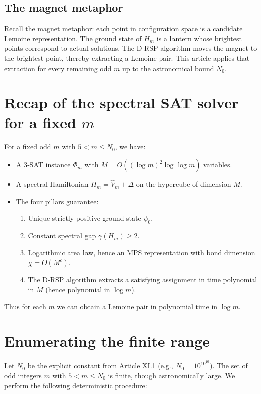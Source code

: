 \documentclass[11pt,a4paper]{article}
\begin{document}
\subsection{The magnet metaphor}

Recall the magnet metaphor: each point in configuration space is a candidate Lemoine representation. The ground state of \(H_m\) is a lantern whose brightest points correspond to actual solutions. The D‑RSP algorithm moves the magnet to the brightest point, thereby extracting a Lemoine pair. This article applies that extraction for every remaining odd \(m\) up to the astronomical bound \(N_0\).

\section{Recap of the spectral SAT solver for a fixed \(m\)}

For a fixed odd \(m\) with \(5 < m \le N_0\), we have:
\begin{itemize}
\item A 3‑SAT instance \(\Phi_m\) with \(M = O((\log m)^2 \log \log m)\) variables.
\item A spectral Hamiltonian \(H_m = \hat{V}_m + \Delta\) on the hypercube of dimension \(M\).
\item The four pillars guarantee:
  \begin{enumerate}
  \item Unique strictly positive ground state \(\psi_0\).
  \item Constant spectral gap \(\gamma(H_m) \ge 2\).
  \item Logarithmic area law, hence an MPS representation with bond dimension \(\chi = O(M^c)\).
  \item The D‑RSP algorithm extracts a satisfying assignment in time polynomial in \(M\) (hence polynomial in \(\log m\)).
  \end{enumerate}
\end{itemize}
Thus for each \(m\) we can obtain a Lemoine pair in polynomial time in \(\log m\).

\section{Enumerating the finite range}

Let \(N_0\) be the explicit constant from Article XI.1 (e.g., \(N_0 = 10^{10^{10}}\)). The set of odd integers \(m\) with \(5 < m \le N_0\) is finite, though astronomically large. We perform the following deterministic procedure:
\end{document}
